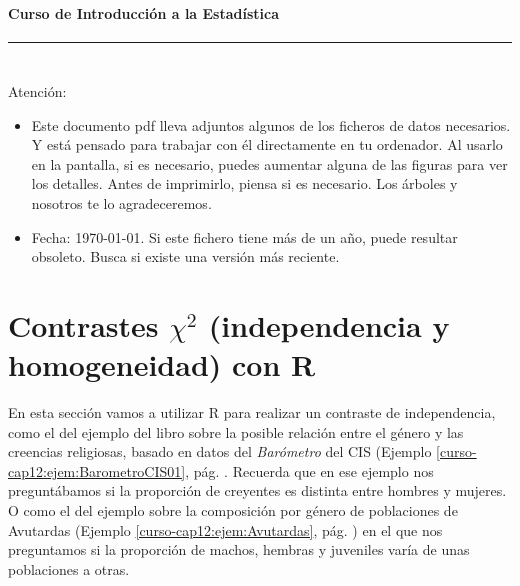 \documentclass[10pt,a4paper]{article}\usepackage[]{graphicx}\usepackage[]{color}
\newcounter {cont01}
\begin{document}

\paragraph{\hspace{6.3cm}Curso de Introducción a la Estadística\\[2mm]} \noindent\hrule

\setcounter{section}{0}
\section*{\hspace{-0.1cm}} Atención:
\begin{itemize}
  \item Este documento pdf lleva adjuntos algunos de los ficheros de datos necesarios. Y está
      pensado para trabajar con él directamente en tu ordenador. Al usarlo en la pantalla, si es
      necesario, puedes aumentar alguna de las figuras para ver los detalles. Antes de
      imprimirlo, piensa si es necesario. Los árboles y nosotros te lo agradeceremos.
  \item Fecha: \today. Si este fichero tiene más de un año, puede resultar obsoleto. Busca si
      existe una versión más reciente.
\end{itemize}
\setcounter{tocdepth}{1}
\tableofcontents

\section{Contrastes $\chi^2$ (independencia y homogeneidad) con R}

En esta sección vamos a  utilizar R para realizar un contraste de independencia, como el del ejemplo del libro sobre la posible relación entre el género y las creencias religiosas, basado en datos del {\em Barómetro} del CIS (Ejemplo \ref{curso-cap12:ejem:BarometroCIS01}, pág. \pageref{curso-cap12:ejem:BarometroCIS01}. Recuerda que en ese ejemplo nos preguntábamos si la proporción de creyentes es distinta entre hombres y mujeres. O como el del ejemplo sobre la composición por género de poblaciones de Avutardas (Ejemplo \ref{curso-cap12:ejem:Avutardas}, pág. \pageref{curso-cap12:ejem:Avutardas}) en el que nos preguntamos si la proporción de machos, hembras y juveniles varía de unas poblaciones a otras.
\end{document}

